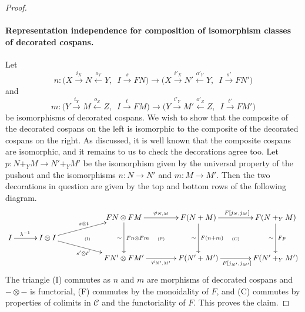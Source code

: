 \begin{proof}
\paragraph{Representation independence for composition of isomorphism
classes of decorated cospans.}
Let 
\[
  n\colon  \big(X \stackrel{i_X}\longrightarrow N \stackrel{o_Y}\longleftarrow Y,\enspace I
\stackrel{s}\longrightarrow FN\big) \longrightarrow \big(X \stackrel{i'_X}\longrightarrow N'
\stackrel{o'_Y}\longleftarrow Y,\enspace I \stackrel{s'}\longrightarrow FN'\big)
\]
and
\[
  m\colon  \big(Y \stackrel{i_Y}\longrightarrow M \stackrel{o_Z}\longleftarrow Z,\enspace I
\stackrel{t}\longrightarrow FM\big) \longrightarrow \big(Y \stackrel{i'_Y}\longrightarrow M'
\stackrel{o'_Z}\longleftarrow Z,\enspace I \stackrel{t'}\longrightarrow FM'\big)
\]
be isomorphisms of decorated cospans. We wish to show that the composite of the
decorated cospans on the left is isomorphic to the composite of the decorated
cospans on the right. As discussed, it is well known that the composite cospans
are isomorphic, and it remains to us to check the decorations agree too. Let $p\colon 
N+_YM \to N'+_YM'$ be the isomorphism given by the universal property of the
pushout and the isomorphisms $n\colon N \to N'$ and $m\colon  M \to M'$. Then the two
decorations in question are given by the top and bottom rows of the following
diagram.
\[
  \xymatrixrowsep{1pc}
  \xymatrixcolsep{1pc}
  \xymatrix{
    &&&& FN \otimes FM \ar[dd]^{Fn \otimes Fm}_\sim
    \ar[rr]^{\varphi_{N,M}} && F(N+M) \ar[dd]^{F(n+m)}_\sim
    \ar[rr]^{F[j_N,j_M]} && F(N+_YM) \ar[dd]^{Fp}_\sim \\ 
    I \ar[rr]^(.4){\lambda^{-1}} && I\otimes I \ar[urr]^{s \otimes t}
    \ar[drr]_{s' \otimes t'} &
    \qquad\textrm{\tiny(I)} && \textrm{\tiny(F)} && \textrm{\tiny(C)}\\ 
    &&&& FN' \otimes FM' \ar[rr]_{\varphi_{N',M'}} && F(N'+M')
    \ar[rr]_{F[j_{N'},j_{M'}]} && F(N'+_YM')
  }
\]
The triangle (I) commutes as $n$ and $m$ are morphisms of decorated cospans and
$- \otimes -$ is functorial, (F) commutes by the monoidality of $F$, and (C)
commutes by properties of colimits in $\mathcal C$ and the functoriality of $F$.
This proves the claim.


\end{proof}
